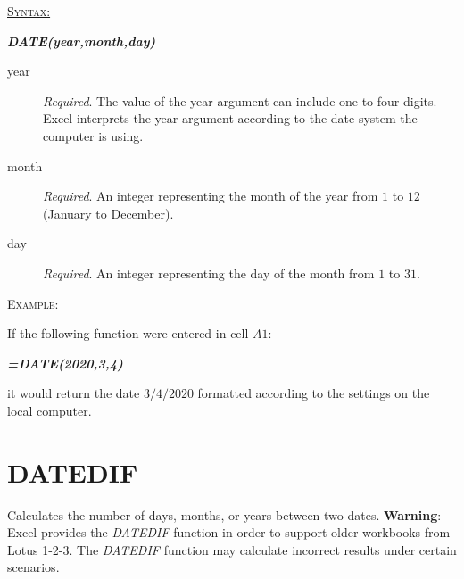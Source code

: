 \begin{addmargin}[1cm]{0cm}

	\medskip
	\underline{\textsc{Syntax:}}
	\medskip

	{\color{Syntax}
		\noindent\textbf{\textit{DATE(year,month,day)}}
	}
	
	\begin{description}
		\item[year] \textit{Required}. The value of the year argument can include one to four digits. Excel interprets the year argument according to the date system the computer is using.
		\item[month] \textit{Required}. An integer representing the month of the year from $ 1 $ to $ 12 $ (January to December).
		\item[day] \textit{Required}. An integer representing the day of the month from $ 1 $ to $ 31 $.
	\end{description}

	\medskip
	\noindent\underline{\textsc{Example:}}
	\medskip
		
	\noindent If the following function were entered in cell $ A1 $:
	
	{\color{Syntax}
		\textit{\textbf{=DATE(2020,3,4)}}
	}

	\noindent it would return the date $ 3/4/2020 $ formatted according to the settings on the local computer.
	
\end{addmargin}

\section{DATEDIF}

Calculates the number of days, months, or years between two dates. \textbf{Warning}: Excel provides the \textit{DATEDIF} function in order to support older workbooks from Lotus 1-2-3. The \textit{DATEDIF} function may calculate incorrect results under certain scenarios.

